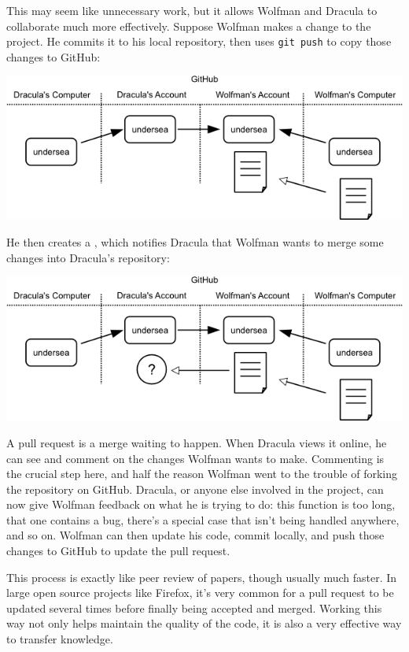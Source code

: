 \documentclass{book}
\begin{document}
This may seem like unnecessary work, but it allows Wolfman and Dracula
to collaborate much more effectively. Suppose Wolfman makes a change to
the project. He commits it to his local repository, then uses
\texttt{git push} to copy those changes to GitHub:

\includegraphics{novice/extras/img/git-forking-02.png}

He then creates a , which
notifies Dracula that Wolfman wants to merge some changes into Dracula's
repository:

\includegraphics{novice/extras/img/git-forking-03.png}

A pull request is a merge waiting to happen. When Dracula views it
online, he can see and comment on the changes Wolfman wants to make.
Commenting is the crucial step here, and half the reason Wolfman went to
the trouble of forking the repository on GitHub. Dracula, or anyone else
involved in the project, can now give Wolfman feedback on what he is
trying to do: this function is too long, that one contains a bug,
there's a special case that isn't being handled anywhere, and so on.
Wolfman can then update his code, commit locally, and push those changes
to GitHub to update the pull request.

This process is exactly like peer review of papers, though usually much
faster. In large open source projects like Firefox, it's very common for
a pull request to be updated several times before finally being accepted
and merged. Working this way not only helps maintain the quality of the
code, it is also a very effective way to transfer knowledge.
\end{document}
